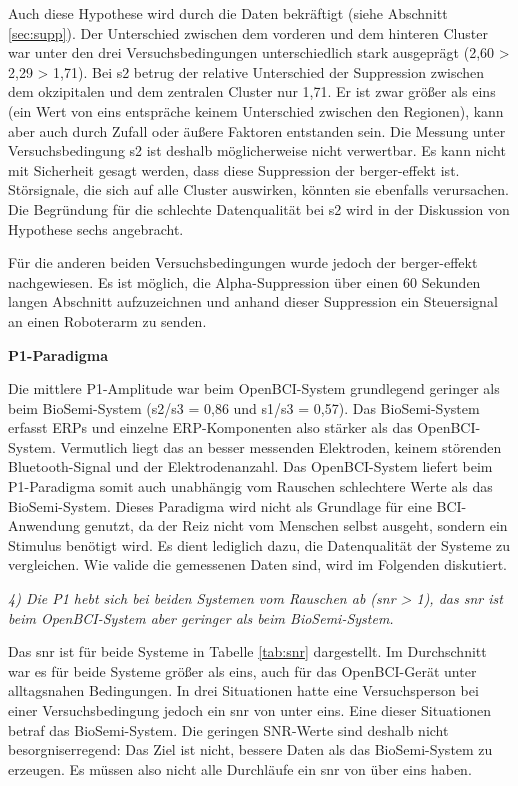 Auch diese Hypothese wird durch die Daten bekräftigt (siehe Abschnitt \ref{sec:supp}). Der Unterschied zwischen dem vorderen und dem hinteren Cluster war unter den drei Versuchsbedingungen unterschiedlich stark ausgeprägt (2,60 > 2,29 > 1,71). Bei s2 betrug der relative Unterschied der Suppression zwischen dem okzipitalen und dem zentralen Cluster nur 1,71. Er ist zwar größer als eins (ein Wert von eins entspräche keinem Unterschied zwischen den Regionen), kann aber auch durch Zufall oder äußere Faktoren entstanden sein. Die Messung unter Versuchsbedingung s2 ist deshalb möglicherweise nicht verwertbar. Es kann nicht mit Sicherheit gesagt werden, dass diese Suppression der \gls{berger-effekt} ist. Störsignale, die sich auf alle Cluster auswirken, könnten sie ebenfalls verursachen. Die Begründung für die schlechte Datenqualität bei s2 wird in der Diskussion von Hypothese sechs angebracht.

Für die anderen beiden Versuchsbedingungen wurde jedoch der \gls{berger-effekt} nachgewiesen. Es ist möglich, die Alpha-Suppression über einen 60 Sekunden langen Abschnitt aufzuzeichnen und anhand dieser Suppression ein Steuersignal an einen Roboterarm zu senden.

\textbf{P1-Paradigma}

Die mittlere P1-Amplitude war beim OpenBCI-System grundlegend geringer als beim BioSemi-System (s2/s3 = 0,86 und s1/s3 = 0,57). Das BioSemi-System erfasst ERPs und einzelne ERP-Komponenten also stärker als das OpenBCI-System. Vermutlich liegt das an besser messenden Elektroden, keinem störenden Bluetooth-Signal und der Elektrodenanzahl. Das OpenBCI-System liefert beim P1-Paradigma somit auch unabhängig vom Rauschen schlechtere Werte als das BioSemi-System. Dieses Paradigma wird nicht als Grundlage für eine BCI-Anwendung genutzt, da der Reiz nicht vom Menschen selbst ausgeht, sondern ein Stimulus benötigt wird. Es dient lediglich dazu, die Datenqualität der Systeme zu vergleichen. Wie valide die gemessenen Daten sind, wird im Folgenden diskutiert.

\textit{4) Die P1 hebt sich bei beiden Systemen vom Rauschen ab (\acrshort{snr} > 1), das \acrshort{snr} ist beim OpenBCI-System aber geringer als beim BioSemi-System.}

Das \acrshort{snr} ist für beide Systeme in Tabelle \ref{tab:snr} dargestellt. Im Durchschnitt war es für beide Systeme größer als eins, auch für das OpenBCI-Gerät unter alltagsnahen Bedingungen. In drei Situationen hatte eine Versuchsperson bei einer Versuchsbedingung jedoch ein \acrshort{snr} von unter eins. Eine dieser Situationen betraf das BioSemi-System. Die geringen SNR-Werte sind deshalb nicht besorgniserregend: Das Ziel ist nicht, bessere Daten als das BioSemi-System zu erzeugen. Es müssen also nicht alle Durchläufe ein \acrshort{snr} von über eins haben.

